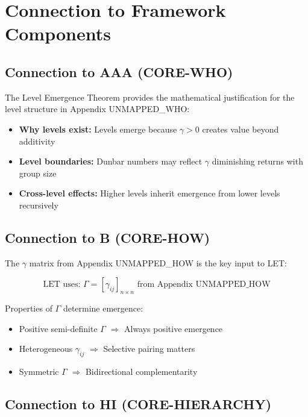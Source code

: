 \section{Connection to Framework Components}
\label{sec:let-connections}

\subsection{Connection to AAA (CORE-WHO)}

The Level Emergence Theorem provides the mathematical justification for the
level structure in Appendix UNMAPPED_WHO:

\begin{itemize}
\item \textbf{Why levels exist:} Levels emerge because $\gamma > 0$ creates
value beyond additivity
\item \textbf{Level boundaries:} Dunbar numbers may reflect $\gamma$
diminishing returns with group size
\item \textbf{Cross-level effects:} Higher levels inherit emergence from
lower levels recursively
\end{itemize}

\subsection{Connection to B (CORE-HOW)}

The $\gamma$ matrix from Appendix UNMAPPED_HOW is the key input to LET:

\begin{equation}
\text{LET uses: } \Gamma = [\gamma_{ij}]_{n \times n} \text{ from Appendix UNMAPPED_HOW}
\end{equation}

Properties of $\Gamma$ determine emergence:
\begin{itemize}
\item Positive semi-definite $\Gamma$ $\Rightarrow$ Always positive emergence
\item Heterogeneous $\gamma_{ij}$ $\Rightarrow$ Selective pairing matters
\item Symmetric $\Gamma$ $\Rightarrow$ Bidirectional complementarity
\end{itemize}

\subsection{Connection to HI (CORE-HIERARCHY)}

